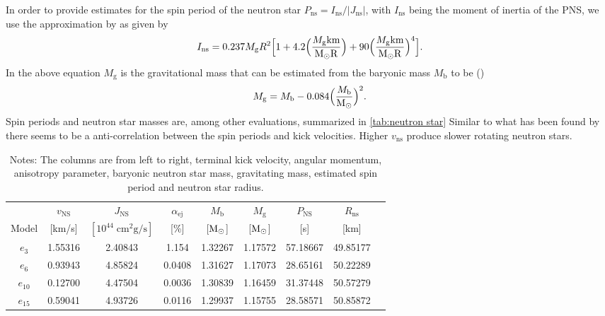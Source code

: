 \documentclass[fleqn,usenatbib]{mnras}
\newcommand{\solm}{\xspace\ensuremath{\rm{M_{\odot}}}}
\newcommand{\rns}{$R_{\mathrm{ns}}$\xspace\xspace}
\begin{document}
In order to provide estimates for the spin period of the neutron star $P_{\mathrm{ns}}=I_{\mathrm{ns}}/|J_{\mathrm{ns}}|$, with $I_{\mathrm{ns}}$ being the moment of inertia of the PNS, we use the approximation by \citet{Lattimer2005} as given by
\begin{equation}
	I_{\mathrm{ns}} = 0.237M_{\mathrm{g}}R^2\Big[ 1 + 
    4.2 \Big( \frac{M_{\mathrm{g}} \mathrm{km }}{\solm R}\Big)  + 
    90 \Big( \frac{M_{\mathrm{g}} \mathrm{km }}{\solm R}\Big)^4
    \Big].
    \label{equ: ins}
\end{equation}
In the above equation $M_{\mathrm{g}}$ is the gravitational mass that can be estimated from the baryonic mass $M_{\mathrm{b}}$ to be (\citet{Lattimer2000})
\begin{equation}
	M_{\mathrm{g}} = M_{\mathrm{b}} - 0.084\Big( \frac{M_{\mathrm{b}}}{\solm}\Big)^2.
\end{equation}Spin periods and neutron star masses are, among other evaluations, summarized in \autoref{tab:neutron star}
Similar to what has been found by \citet{Muller2018b} there seems to be a anti-correlation between the spin periods and kick velocities. Higher $v_{\mathrm{ns}}$ produce slower rotating neutron stars.

\begin{table}
\centering
\begin{tabular}{ccccccccc}
            & $v_{\mathrm{NS}}$& $J_{\mathrm{NS}}$    & $\alpha_{\mathrm{ej}}$& $M_{\mathrm{b}}$& $M_{\mathrm{g}}$ & $P_{\mathrm{NS}}$& \rns \\
    Model & [km/s]           & $[10^{44}\; \mathrm{cm^2 g/s}]$ &         [\%]              &  [\solm]        &  [\solm]         & [s]              &  [km] \\
    
    \hline 
    $e_{3}$  &      1.55316 &             2.40843 &   1.154 &     1.32267 &      1.17572 &  57.18667 &  49.85177 \\
    $e_{6}$  &      0.93943 &             4.85824 &   0.0408 &     1.31627 &      1.17073 &  28.65161 &  50.22289 \\
    $e_{10}$ &      0.12700 &             4.47504 &   0.0036 &     1.30839 &      1.16459 &  31.37448 &  50.57279 \\
    $e_{15}$ &      0.59041 &             4.93726 &   0.0116 &     1.29937 &      1.15755 &  28.58571 &  50.85872
\end{tabular}
\caption{Notes: The columns are from left to right, terminal kick velocity, angular momentum, anisotropy parameter, baryonic neutron star mass, gravitating mass, estimated spin period and neutron star radius.}
\label{tab:neutron star}
\end{table}
\end{document}
